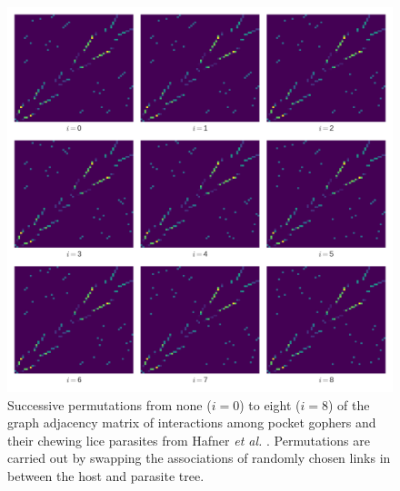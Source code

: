 
\begin{figure}
    \centering
    \includegraphics[width=\textwidth]{figures/gopher_louse_adjacency_permutations}
    \caption{Successive permutations from none ($i=0$) to eight ($i=8$) of the graph adjacency matrix of interactions among pocket gophers and their chewing lice parasites from Hafner {\em et al.} \cite{hafner1994disparate}. Permutations are carried out by swapping the associations of randomly chosen links in between the host and parasite tree. }
    \label{fig:FP_ajperm}
\end{figure}
